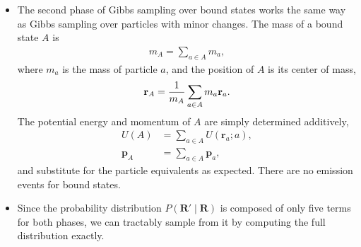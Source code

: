 \documentclass[12pt,letterpaper]{article}
\newcommand{\mb}{\mathbf}
\begin{document}
\begin{itemize}
\begin{align*}
|a(\mb{r} - \mb{r}_{i}) + (q \Delta t)b(\mb{r} - \mb{r}_{i})|^{2} - |a(\mb{r} - \mb{r}_{i})|^{2} = {2m_{j}cE_{emit} \over |\mb{r} - \mb{r}_{i}|}.
\end{align*}
This can be readily solved, yielding
\begin{align*}
b = {1 \over q_{j} \Delta t}\left(-a + \sqrt{a^{2} + {2m_{j}cE_{emit} \over |\mb{r} - \mb{r}_{i}|^{3}}}\right).
\end{align*}
Substituting $a = |\mb{p}_{j}| / |\mb{r} - \mb{r}_{i}|$ and simplifying, we update the emission field by setting
\begin{align*}
\mb{F}'_{emit}(\mb{r}) = \mb{F}_{emit}(\mb{r}) + {\mb{r} - \mb{r}_{i} \over q_{j} \Delta t|\mb{r} - \mb{r}_{i}|}\left(\sqrt{|\mb{p}_{j}|^{2} + {2m_{j}cE_{emit} \over |\mb{r} - \mb{r}_{i}|}} - |\mb{p}_{j}|\right).
\end{align*}
\item The second phase of Gibbs sampling over bound states works the same way as Gibbs sampling over particles with minor changes. The mass of a bound state $A$ is
\begin{align*}
m_{A} = \sum_{a \in A}m_{a},
\end{align*}
where $m_{a}$ is the mass of particle $a$, and the position of $A$ is its center of mass,
\begin{align*}
\mb{r}_{A} = {1 \over m_{A}}\sum_{a \in A}m_{a}\mb{r}_{a}.
\end{align*}
The potential energy and momentum of $A$ are simply determined additively,
\begin{align*}
U(A) &= \sum_{a \in A}U(\mb{r}_{a}; a), \\
\mb{p}_{A} &= \sum_{a \in A}\mb{p}_{a},
\end{align*}
and substitute for the particle equivalents as expected. There are no emission events for bound states.
\item Since the probability distribution $P(\mb{R}' \mid \mb{R})$ is composed of only five terms for both phases, we can tractably sample from it by computing the full distribution exactly.
\end{itemize}

\end{document}
